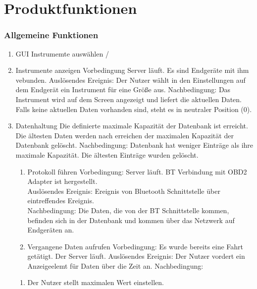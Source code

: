 \documentclass[pflichtenheft.tex]{subfiles}
\begin{document}
\chapter{Produktfunktionen}

\subsection{Allgemeine Funktionen}

\begin{enumerate}
	
	\item{GUI Instrumemte auswählen} /

	\item{Instrumente anzeigen} Vorbedingung Server läuft. Es sind Endgeräte mit ihm vebunden. Auslösendes Ereignis: Der Nutzer wählt in den Einstellungen auf dem Endgerät ein Instrument für eine Größe aus. Nachbedingung: Das Instrument wird auf dem Screen angezeigt und liefert die aktuellen Daten. Falls keine aktuellen Daten vorhanden sind, steht es in neutraler Position (0).



	\item{Datenhaltung} Die definierte maximale Kapazität der Datenbank ist erreicht. Die ältesten Daten werden nach erreichen der maximalen Kapazität der Datenbank gelöscht.
	Nachbedingung: Datenbank hat weniger Einträge als ihre maximale Kapazität. Die ältesten Einträge wurden gelöscht.

	\begin{enumerate}
		\item{Protokoll führen} Vorbedingung: Server läuft. BT Verbindung mit OBD2 Adapter ist hergestellt.
		\\Auslösendes Ereignis: Ereignis von Bluetooth Schnittstelle über eintreffendes Ereignis. %
		\\Nachbedingung: Die Daten, die von der BT Schnittstelle kommen, befinden sich in der Datenbank und kommen über das Netzwerk auf Endgeräten an.
		\item{Vergangene Daten aufrufen} Vorbedingung: Es wurde bereits eine Fahrt getätigt. Der Server läuft. Auslösendes Ereignis: Der Nutzer vordert ein Anzeigeelemt für Daten über die Zeit an. Nachbedingung: 
	\end{enumerate} 
	\begin{enumerate}
		\item Der Nutzer stellt maximalen Wert einstellen.
	\end{enumerate}


\end{enumerate}
\end{document}
